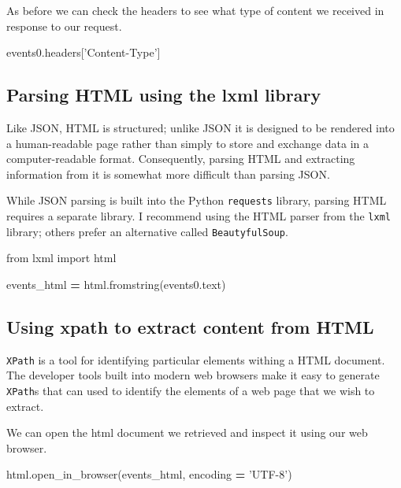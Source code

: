 \documentclass[]{book}
\newenvironment{Shaded}{\begin{snugshade}}{\end{snugshade}}
\newcommand{\StringTok}[1]{\textcolor[rgb]{0.31,0.60,0.02}{#1}}
\newcommand{\ImportTok}[1]{#1}
\newcommand{\OperatorTok}[1]{\textcolor[rgb]{0.81,0.36,0.00}{\textbf{#1}}}
\newcommand{\NormalTok}[1]{#1}
\begin{document}
As before we can check the headers to see what type of content we
received in response to our request.

\begin{Shaded}
\begin{Highlighting}[]
\NormalTok{events0.headers[}\StringTok{'Content-Type'}\NormalTok{]}
\end{Highlighting}
\end{Shaded}

\subsection{Parsing HTML using the lxml
library}\label{parsing-html-using-the-lxml-library}

Like JSON, HTML is structured; unlike JSON it is designed to be rendered
into a human-readable page rather than simply to store and exchange data
in a computer-readable format. Consequently, parsing HTML and extracting
information from it is somewhat more difficult than parsing JSON.

While JSON parsing is built into the Python \texttt{requests} library,
parsing HTML requires a separate library. I recommend using the HTML
parser from the \texttt{lxml} library; others prefer an alternative
called \texttt{BeautyfulSoup}.

\begin{Shaded}
\begin{Highlighting}[]
\ImportTok{from}\NormalTok{ lxml }\ImportTok{import}\NormalTok{ html}

\NormalTok{events_html }\OperatorTok{=}\NormalTok{ html.fromstring(events0.text)}
\end{Highlighting}
\end{Shaded}

\subsection{Using xpath to extract content from
HTML}\label{using-xpath-to-extract-content-from-html}

\texttt{XPath} is a tool for identifying particular elements withing a
HTML document. The developer tools built into modern web browsers make
it easy to generate \texttt{XPath}s that can used to identify the
elements of a web page that we wish to extract.

We can open the html document we retrieved and inspect it using our web
browser.

\begin{Shaded}
\begin{Highlighting}[]
\NormalTok{html.open_in_browser(events_html, encoding }\OperatorTok{=} \StringTok{'UTF-8'}\NormalTok{)}
\end{Highlighting}
\end{Shaded}
\end{document}
